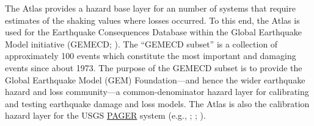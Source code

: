 \documentclass[letterpaper,10pt,english]{sphinxmanual}
\begin{document}
The Atlas provides a hazard base layer for an number of systems that require estimates of the shaking values where losses occurred.
To this end, the Atlas is used for the Earthquake Consequences Database within the Global Earthquake
Model initiative (GEMECD; {\hyperref[references:so2014]{}}).
The ``GEMECD subset'' is a collection of approximately 100 events which constitute
the most important and damaging
events since about 1973. The purpose of the GEMECD subset is to provide the
Global
Earthquake Model (GEM) Foundation---and hence the wider earthquake hazard and
loss community---a common-denominator hazard layer
for calibrating and testing earthquake damage and loss models. The Atlas is also
the calibration hazard layer for the USGS
\href{http://earthquake.usgs.gov/research/pager/}{PAGER} system  (e.g., {\hyperref[references:wald2008]{}}; {\hyperref[references:jaiswal2010]{}}; {\hyperref[references:pomonis2011]{}}).
\end{document}
